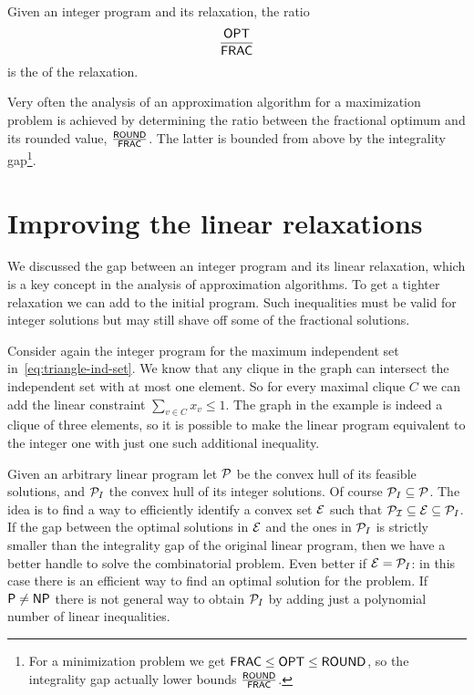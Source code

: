 \documentclass[a4paper,twoside,justified]{tufte-handout}
\begin{document}
\begin{definition}
  Given an integer program and its relaxation, the ratio 
\begin{equation}
  \frac{\mathsf{OPT}}{\mathsf{FRAC}}
\end{equation}
is the  of the relaxation.
\end{definition}

Very often the analysis of an approximation algorithm for a
maximization problem is achieved by determining the ratio between the
fractional optimum and its rounded value, $ \frac{\mathsf{ROUND}}{\mathsf{FRAC}}
$. The latter is bounded from above by the integrality
gap\footnote{For a minimization problem we get $ \mathsf{FRAC} \leq \mathsf{OPT}
  \leq \mathsf{ROUND} $, so the integrality gap actually lower bounds $
  \frac{\mathsf{ROUND}}{\mathsf{FRAC}}$.}.

\section{Improving the linear relaxations}

We discussed the gap between an integer program and its linear
relaxation, which is a key concept in the analysis of approximation
algorithms. To get a tighter relaxation we can add
 to the initial program. Such
inequalities must be valid for integer solutions but may still shave
off some of the fractional solutions.
\begin{marginfigure}
  Consider again the integer program for the maximum independent set
  in~\eqref{eq:triangle-ind-set}. We know that any clique in the graph
  can intersect the independent set with at most one element. So for
  every maximal clique $ C $ we can add the linear constraint $
  \sum_{v\in C}x_{v} \leq 1$. The graph in the example is indeed a
  clique of three elements, so it is possible to make the linear
  program equivalent to the integer one with just one such additional
  inequality.
\end{marginfigure}

Given an arbitrary linear program let $ \mathcal{P}$ be the convex hull of
its feasible solutions, and $ \mathcal{P}_{I} $ the convex hull of its
integer solutions. Of course $ \mathcal{P}_{I}\subseteq\mathcal{P} $. The idea
is to find a way to efficiently identify a convex set $ \mathcal{E} $ such
that $ \mathcal{P_{I}}\subseteq \mathcal{E} \subseteq\mathcal{P}_{I} $.  If the
gap between the optimal solutions in $ \mathcal{E} $ and the ones in $
\mathcal{P}_{I} $ is strictly smaller than the integrality gap of the
original linear program, then we have a better handle to solve the
combinatorial problem. Even better if $ \mathcal{E}=\mathcal{P}_{I} $: in this
case there is an efficient way to find an optimal solution for the
problem.
%
If $ \mathsf{P}\neq\mathsf{NP} $ there is not general way to obtain $\mathcal{P}_{I} $
by adding just a polynomial number of linear inequalities.
\end{document}
